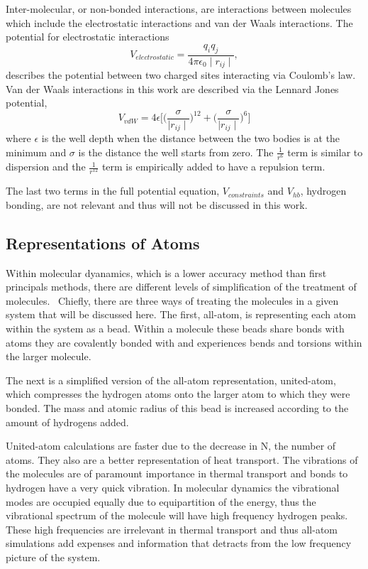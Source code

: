 Inter-molecular,  or non-bonded interactions, are interactions between molecules which include the electrostatic interactions and van der Waals interactions.
The potential for electrostatic interactions
\begin{equation}
    V_{electrostatic} = \frac{q_i q_j}{4 \pi \epsilon_0 \mid r_{ij}\mid},
\end{equation}
describes the potential between two charged sites interacting via Coulomb's law.
Van der Waals interactions in this work are described via the Lennard Jones potential,
\begin{equation}
    V_{vdW} = 4\epsilon\bigg[\bigg(\frac{\sigma}{\mid r_{ij}\mid}\bigg)^{12} + \bigg(\frac{\sigma}{\mid r_{ij}\mid}\bigg)^6\big]
\end{equation}
where $\epsilon$ is the well depth when the distance between the two bodies is at the minimum and $\sigma$ is the distance the well starts from zero. 
The $\frac{1}{r^6}$ term is similar to dispersion and the $\frac{1}{r^{12}}$ term is empirically added to have a repulsion term.

The last two terms in the full potential equation, $V_{constraints}$ and $V_{hb}$, hydrogen bonding, are not relevant and thus will not be discussed in this work.

\subsection{Representations of Atoms}
Within molecular dyanamics, which is a lower accuracy method than first principals methods, there are different levels of simplification of the treatment of molecules.~\cite{Leach2001} 
Chiefly, there are three ways of treating the molecules in a given system that will be discussed here. 
The first, all-atom, is representing each atom within the system as a bead. Within a molecule these beads share bonds with atoms they are covalently bonded with and experiences bends and torsions within the larger molecule.

The next is a simplified version of the all-atom representation, united-atom, which compresses the hydrogen atoms onto the larger atom to which they were bonded. The mass and atomic radius of this bead is increased according to the amount of hydrogens added.

United-atom calculations are faster due to the decrease in N, the number of atoms. They also are a better representation of heat transport. The vibrations of the molecules are of paramount importance in thermal transport and bonds to hydrogen have a very quick vibration. In molecular dynamics the vibrational modes are occupied equally due to equipartition of the energy, thus the vibrational spectrum of the molecule will have high frequency hydrogen peaks. These high frequencies are irrelevant in thermal transport and thus all-atom simulations add expenses and information that detracts from the low frequency picture of the system.

